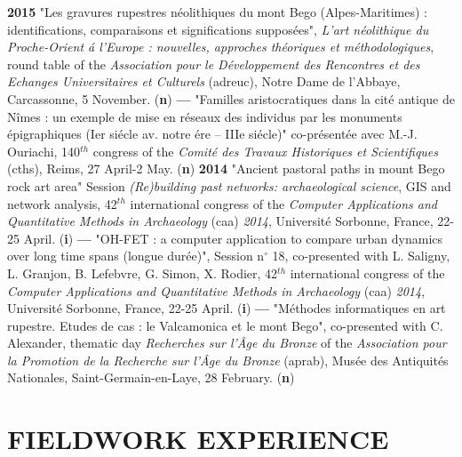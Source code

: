 \documentclass[11pt]{report} %
\begin{document}
\smallbreak
\textbf{2015 }"Les gravures rupestres n\'{e}olithiques du mont Bego (Alpes-Maritimes) : identifications, comparaisons et significations suppos\'{e}es", \textit{L'art n\'{e}olithique du Proche-Orient \'{a} l'Europe : nouvelles, approches th\'{e}oriques et m\'{e}thodologiques}, round table of the \textit{Association pour le D\'{e}veloppement des Rencontres et des Echanges Universitaires et Culturels} (adreuc), Notre Dame de l'Abbaye, Carcassonne, 5 November. (\textbf{n})
\smallbreak
\textbf{---  }"Familles aristocratiques dans la cit\'{e} antique de N\^{i}mes : un exemple de mise en r\'{e}seaux des individus par les monuments \'{e}pigraphiques (Ier si\'{e}cle av. notre \'{e}re -- IIIe si\'{e}cle)" co-pr\'{e}sent\'{e}e avec M.-J. Ouriachi, 140${}^{th}$ congress of the \textit{Comit\'{e} des Travaux Historiques et Scientifiques} (cths), Reims, 27 April-2 May. (\textbf{n})
\smallbreak
\textbf{2014 }"Ancient pastoral paths in mount Bego rock art area" Session \textit{(Re)building past networks: archaeological science}, GIS and network analysis, 42${}^{th}$ international congress of the \textit{Computer Applications and Quantitative Methods in Archaeology }(caa) \textit{2014}, Universit\'{e} Sorbonne, France, 22-25 April. (\textbf{i})\textbf{}
\smallbreak
\textbf{---  }"OH-FET : a computer application to compare urban dynamics over long time spans (longue dur\'{e}e)", Session n$\mathrm{{}^\circ}$ 18, co-presented with L. Saligny, L. Granjon, B. Lefebvre, G. Simon, X. Rodier, 42${}^{th}$ international congress of the \textit{Computer Applications and Quantitative Methods in Archaeology }(caa)\textit{ 2014}, Universit\'{e} Sorbonne, France, 22-25 April. (\textbf{i})
\smallbreak
\textbf{---  }"M\'{e}thodes informatiques en art rupestre. Etudes de cas : le Valcamonica et le mont Bego", co-presented with C. Alexander, thematic day \textit{Recherches sur l'\^{A}ge du Bronze }of the\textit{ Association pour la Promotion de la Recherche sur l'\^{A}ge du Bronze }(aprab), Mus\'{e}e des Antiquit\'{e}s Nationales, Saint-Germain-en-Laye, 28 February. (\textbf{n})

\section*{FIELDWORK EXPERIENCE}
\end{document}
